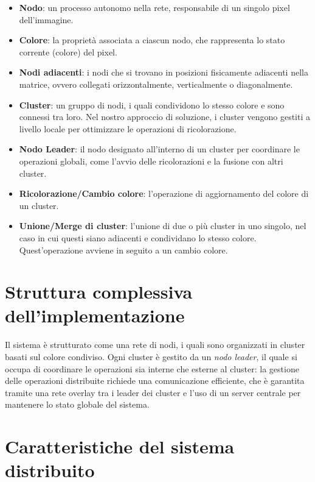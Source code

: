 \documentclass[12pt, a4paper]{report}
\begin{document}
\begin{itemize}[label=]
    \item \textbf{Nodo}: un processo autonomo nella rete, responsabile di un singolo pixel dell'immagine.
    \item \textbf{Colore}: la propriet\`a associata a ciascun nodo, che rappresenta lo stato corrente (colore) del pixel.
    \item \textbf{Nodi adiacenti}: i nodi che si trovano in posizioni fisicamente adiacenti nella matrice, ovvero collegati orizzontalmente, verticalmente o diagonalmente.
    \item \textbf{Cluster}: un gruppo di nodi, i quali condividono lo stesso colore e sono connessi tra loro. Nel nostro approccio di soluzione, i cluster vengono gestiti a livello locale per ottimizzare le operazioni di ricolorazione.
    \item \textbf{Nodo Leader}: il nodo designato all'interno di un cluster per coordinare le operazioni globali, come l'avvio delle ricolorazioni e la fusione con altri cluster.
    \item \textbf{Ricolorazione/Cambio colore}: l'operazione di aggiornamento del colore di un cluster.
    \item \textbf{Unione/Merge di cluster}: l'unione di due o pi\`u cluster in uno singolo, nel caso in cui questi siano adiacenti e condividano lo stesso colore. Quest'operazione avviene in seguito a un cambio colore.
\end{itemize}

\section{Struttura complessiva dell'implementazione}

Il sistema \`e strutturato come una rete di nodi, i quali sono organizzati in cluster basati sul colore condiviso. Ogni cluster \`e gestito da un \emph{nodo leader}, il quale si occupa di coordinare le operazioni sia interne che esterne al cluster: la gestione delle operazioni distribuite richiede una comunicazione efficiente, che \`e garantita tramite una rete overlay tra i leader dei cluster e l'uso di un server centrale per mantenere lo stato globale del sistema.

\section{Caratteristiche del sistema distribuito}
\end{document}
